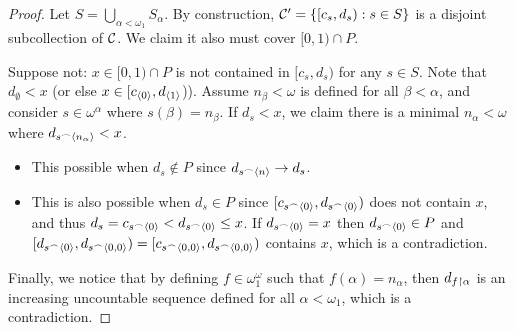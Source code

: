 \begin{proof}
  Let $S = \bigcup_{\alpha<\omega_1} S_\alpha$. By construction, $\mathcal{C}' = \{[c_s,d_s) : s\in S\}$ is a disjoint subcollection of $\mathcal{C}$. We claim it also must cover $[0,1)\cap P$.

  Suppose not: $x\in[0,1)\cap P$ is not contained in $[c_s,d_s)$ for any $s\in S$. Note that $d_\emptyset<x$ (or else $x\in[c_{\langle0\rangle},d_{\langle1\rangle}$)). Assume $n_\beta<\omega$ is defined for all $\beta<\alpha$, and consider $s\in\omega^\alpha$ where $s(\beta)=n_\beta$. If $d_s<x$, we claim there is a minimal $n_\alpha<\omega$ where $d_{s^\frown\langle n_\alpha\rangle}<x$.
    \begin{itemize}
      \item This possible when $d_s\not\in P$ since $d_{s^\frown\langle n\rangle}\to d_s$.
      \item This is also possible when $d_s\in P$ since $[c_{s^\frown\langle0\rangle},d_{s^\frown\langle0\rangle})$ does not contain $x$, and thus $d_s=c_{s^\frown\langle0\rangle}<d_{s^\frown\langle0\rangle}\leq x$. If $d_{s^\frown\langle0\rangle} = x$ then $d_{s^\frown\langle0\rangle}\in P$ and $[d_{s^\frown\langle0\rangle},d_{s^\frown\langle0,0\rangle})=[c_{s^\frown\langle0,0\rangle},d_{s^\frown\langle0,0\rangle})$ contains $x$, which is a contradiction.
    \end{itemize}

  Finally, we notice that by defining $f\in\omega^\omega_1$ such that $f(\alpha)=n_\alpha$, then $d_{f\restriction\alpha}$ is an increasing uncountable sequence defined for all $\alpha<\omega_1$, which is a contradiction.
\end{proof}

